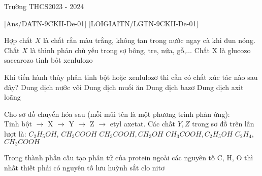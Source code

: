 \begin{name}{Trường THCS}{2023 - 2024}
\end{name}
[Ans/DATN-9CKII-De-01]
{}[LOIGIAITN/LGTN-9CKII-De-01]
\begin{ex}
	Hợp chất $X$ là chất rắn màu trắng, không tan trong nước ngay cà khi đun nóng. Chất $X$ là thình phản chù yếu trong sợ bông, tre, nứa, gỗ,$\ldots$ Chất X là
	\choice
	{glucozo}
	{saccarozo}
	{tinh bôt}
	{\True xenlulozo}
\end{ex}
\begin{ex}
	Khi tiến hành thủy phân tinh bột hoặc xenlulozơ thì cần có chất xúc tác nào sau đây?
	\choice
	{Dung dịch nước vôi}
	{Dung dịch muối ăn}
	{Dung dịch bazơ}
	{\True Dung dịch axit loãng}
\end{ex}
\begin{ex}Cho sơ đồ chuyển hóa sau (mỗi mũi tên là một phương trình phản ứng):\\ 
	Tinh bột $\rightarrow$ X $\rightarrow$ Y $\rightarrow$ Z $\rightarrow$ etyl axetat.
	Các chất $Y, Z$ trong sơ đồ trên lần lượt là:
	\choice
	{\True $C_2H_5OH$, $CH_3COOH$}
	{$CH_3COOH, CH_3OH$}
	{$CH_3COOH, C_2H_5OH$}
	{$C_2H_4$, $CH_3COOH$}
\end{ex}
\begin{ex}
	Trong thành phần cấu tạo phân tử của protein ngoài các nguyên tố C, H, O thì nhất thiết phải có nguyên tố
	\choice
	{lưu huỳnh}
	{sắt}
	{clo}
	{\True nitơ}
\end{ex}
